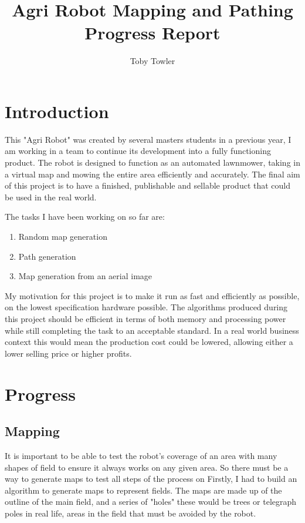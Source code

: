 \documentclass[progress]{cmpreport}
\title{Agri Robot Mapping and Pathing Progress Report}
\author{Toby Towler}
\begin{document}
\maketitle

\section{Introduction}
This "Agri Robot" was created by several masters students in a previous year,
I am working in a team to continue its development into a fully functioning product.
The robot is designed to function as an automated lawnmower, taking in a virtual map and mowing the entire area efficiently and accurately.
The final aim of this project is to have a finished, publishable and sellable product that could be used in the real world.

The tasks I have been working on so far are:
\begin{enumerate}
	\item {Random map generation}
	\item {Path generation}
	\item {Map generation from an aerial image}
\end{enumerate}

My motivation for this project is to make it run as fast and efficiently as possible, on the lowest specification hardware possible.
The algorithms produced during this project should be efficient in terms of both memory and processing power while still completing the task to an acceptable standard.
In a real world business context this would mean the production cost could be lowered, allowing either a lower selling price or higher profits.



\section{Progress}
\subsection{Mapping}
It is important to be able to test the robot's coverage of an area with many shapes of field to ensure it always works on any given area.
So there must be a way to generate maps to test all steps of the process on
Firstly, I had to build an algorithm to generate maps to represent fields. The maps are made up of the outline of the main field,
and a series of "holes" these would be trees or telegraph poles in real life, areas in the field that must be avoided by the robot.
\end{document}
